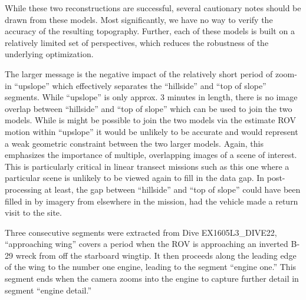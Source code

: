 \documentclass[letterpaper,12pt]{article}
\begin{document}
While these two reconstructions are successful, several cautionary notes should be drawn from these models.   Most significantly, we have no way to verify the accuracy of the resulting topography.   Further, each of these models is built on a relatively limited set of perspectives, which reduces the robustness of the underlying optimization.

The larger message is the negative impact of the relatively short period of zoom-in ``upslope'' which effectively separates the ``hillside'' and ``top of slope'' segments.  While ``upslope'' is only approx. 3 minutes in length, there is no image overlap between ``hillside'' and ``top of slope'' which can be used to join the two models.  While is might be possible to join the two models via the estimate ROV motion within ``upslope'' it would be unlikely to be accurate and would represent a weak geometric constraint between the two larger models.   Again, this emphasizes the importance of multiple, overlapping images of a scene of interest.  This is particularly critical in linear transect missions such as this one where a particular scene is unlikely to be viewed again to fill in the data gap.    In post-processing at least, the gap between ``hillside'' and ``top of slope'' could have been filled in by imagery from elsewhere in the mission, had the vehicle made a return visit to the site.


Three consecutive segments were extracted from Dive EX1605L3\_DIVE22, ``approaching wing'' covers a period when the ROV is approaching an inverted B-29 wreck from off the starboard wingtip.  It then proceeds along the leading edge of the wing to the number one engine, leading to the segment ``engine one.''  This segment ends when the camera zooms into the engine to capture further detail in segment ``engine detail.''
\end{document}
